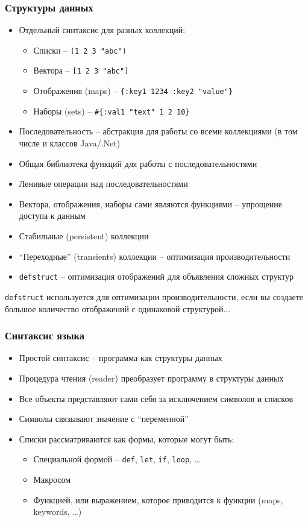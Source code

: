 \documentclass[ignorenonframetext]{beamer}
\begin{document}
\begin{frame}[t,fragile]
  \frametitle{Структуры данных}
  \begin{itemize}
  \item Отдельный синтаксис для разных коллекций:
    \begin{itemize}
    \item Списки -- \texttt{(1 2 3 "abc")}
    \item Вектора -- \texttt{[1 2 3 "abc"]}
    \item Отображения (maps) -- \lstinline!{:key1 1234 :key2 "value"}!
    \item Наборы (sets) -- \lstinline!#{:val1 "text" 1 2 10}!
    \end{itemize}
  \item Последовательность -- абстракция для работы со всеми коллекциями (в том числе и
    классов Java/.Net)
  \item Общая библиотека функций для работы с последовательностями
  \item Ленивые операции над последовательностями
  \item Вектора, отображения, наборы сами являются функциями -- упрощение доступа к данным
  \item Стабильные (persistent) коллекции
  \item ``Переходные'' (transients) коллекции -- оптимизация производительности
  \item \texttt{defstruct} -- оптимизация отображений для объявления сложных структур
  \end{itemize}
\end{frame}

\texttt{defstruct} используется для оптимизации производительности, если вы создаете
большое количество отображений с одинаковой структурой...

\begin{frame}[t]
  \frametitle{Синтаксис языка}
  \begin{itemize}
  \item Простой синтаксис -- программа как структуры данных
  \item Процедура чтения (reader) преобразует программу в структуры данных
  \item Все объекты представляют сами себя за исключением символов и списков
  \item Символы связывают значение с ``переменной''
  \item Списки рассматриваются как формы, которые могут быть:
    \begin{itemize}
    \item Специальной формой -- \texttt{def}, \texttt{let}, \texttt{if}, \texttt{loop}, \ldots{}
    \item Макросом
    \item Функцией, или выражением, которое приводится к функции (maps, keywords, \ldots{})
    \end{itemize}
  \end{itemize}
\end{frame}
\end{document}
